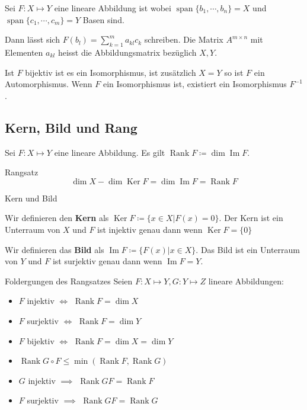 \documentclass[a4paper,10pt]{article}
\DeclareMathOperator{\Rank}{Rank}
\DeclareMathOperator{\Image}{Im}
\DeclareMathOperator{\Kernel}{Ker}
\DeclareMathOperator{\Span}{span}
\begin{document}
Sei $F: X \mapsto Y$ eine lineare Abbildung ist wobei $\Span \{ b_1, \cdots, b_n \} = X$ und $\Span \{ c_1, \cdots, c_m \} = Y$ Basen sind.

Dann lässt sich $F(b_l) = \sum_{k=1}^m a_{kl} c_k$ schreiben. Die Matrix $A^{m \times n}$ mit Elementen $a_{kl}$ heisst die Abbildungsmatrix bezüglich $X, Y$.

Ist $F$ bijektiv ist es ein Isomorphismus, ist zusätzlich $X = Y$ so ist $F$ ein Automorphismus. Wenn $F$ ein Isomorphismus ist, existiert ein Isomorphismus $F^{-1}$.

\subsection{Kern, Bild und Rang}


Sei $F: X \mapsto Y$ eine lineare Abbildung. Es gilt $\Rank F \coloneqq \dim \Image F$.

\begin{mainbox}{Rangsatz}
  $$\dim X - \dim \Kernel F = \dim \Image F = \Rank F$$
\end{mainbox}

\begin{mainbox}{Kern und Bild}

  Wir definieren den \textbf{Kern} als $\Kernel F \coloneqq \{x \in X | F(x) = 0\}$. Der Kern ist ein Unterraum von $X$ und $F$ ist injektiv genau dann wenn $\Kernel F = \{0\}$

  Wir definieren das \textbf{Bild} als $\Image F \coloneqq \{F(x) | x \in X\}$. Das Bild ist ein Unterraum von $Y$ und $F$ ist surjektiv genau dann wenn $\Image F = Y$.
\end{mainbox}

\begin{subbox}{Foldergungen des Rangsatzes}
  Seien $F: X \mapsto Y, G: Y \mapsto Z$ lineare Abbildungen:
  \begin{itemize}
    \item $F$ injektiv $\iff$ $\Rank F = \dim X$
    \item $F$ surjektiv $\iff$ $\Rank F = \dim Y$
    \item $F$ bijektiv $\iff$ $\Rank F = \dim X = \dim Y$
    \item $\Rank G \circ F \leq \min(\Rank F, \Rank G)$
    \item $G$ injektiv $\implies$ $\Rank GF = \Rank F$
    \item $F$ surjektiv $\implies$ $\Rank GF = \Rank G$
  \end{itemize}
\end{subbox}
\end{document}
